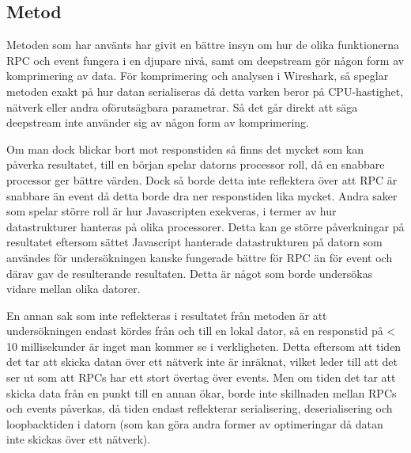 \subsection{Metod}
\label{subsec:tim-discussion-method}
Metoden som har använts har givit en bättre insyn om hur de olika funktionerna RPC och event fungera i en djupare nivå, samt om deepstream gör någon form av komprimering av data. För komprimering och analysen i Wireshark, så speglar metoden exakt på hur datan serialiseras då detta varken beror på CPU-hastighet, nätverk eller andra oförutsägbara parametrar. Så det går direkt att säga deepstream inte använder sig av någon form av komprimering.

Om man dock blickar bort mot responstiden så finns det mycket som kan påverka resultatet, till en början spelar datorns processor roll, då en snabbare processor ger bättre värden. Dock så borde detta inte reflektera över att RPC är snabbare än event då detta borde dra ner responstiden lika mycket. Andra saker som spelar större roll är hur Javascripten exekveras, i termer av hur datastrukturer hanteras på olika processorer. Detta kan ge större påverkningar på resultatet eftersom sättet Javascript hanterade datastrukturen på datorn som användes för undersökningen kanske fungerade bättre för RPC än för event och därav gav de resulterande resultaten. Detta är något som borde undersökas vidare mellan olika datorer. 

En annan sak som inte reflekteras i resultatet från metoden är att undersökningen endast kördes från och till en lokal dator, så en responstid på < 10 millisekunder är inget man kommer se i verkligheten. Detta eftersom att tiden det tar att skicka datan över ett nätverk inte är inräknat, vilket leder till att det ser ut som att RPCs har ett stort övertag över events. Men om tiden det tar att skicka data från en punkt till en annan ökar, borde inte skillnaden mellan RPCs och events påverkas, då tiden endast reflekterar serialisering, deserialisering och loopbacktiden i datorn (som kan göra andra former av optimeringar då datan inte skickas över ett nätverk).
